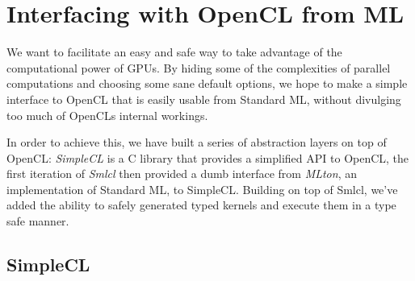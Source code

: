 \section{Interfacing with OpenCL from ML}

We want to facilitate an easy and safe way to take advantage of the
computational power of GPUs. By hiding some of the complexities of
parallel computations and choosing some sane default options, we hope
to make a simple interface to OpenCL that is easily usable from
Standard ML, without divulging too much of OpenCLs internal workings.

In order to achieve this, we have built a series of abstraction layers
on top of OpenCL: \emph{SimpleCL} is a C library that provides a
simplified API to OpenCL, the first iteration of \emph{Smlcl} then
provided a dumb interface from \emph{MLton}, an implementation of Standard
ML, to SimpleCL. Building on top of Smlcl, we've added the ability to
safely generated typed kernels and execute them in a type safe manner.

\subsection{SimpleCL}
